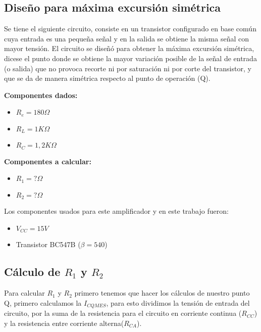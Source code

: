 \begin{multicols}{2}

	\section{Diseño para máxima excursión simétrica}

	\sangria{} Se tiene el siguiente circuito, consiste en un transistor configurado en base común cuya entrada es una pequeña señal y en la salida se obtiene la misma señal con mayor tensión.
	\sangria{} El circuito se diseñó para obtener la máxima excursión simétrica, dicese el punto donde se obtiene la mayor variación posible de la señal de entrada (o salida) que no provoca recorte ni por saturación ni por corte del transistor, y que se da de manera simétrica respecto al punto de operación (Q). \\[5pt]


	\textbf{Componentes dados:}
    \begin{itemize}[nosep]
        \item $R_e = 180\Omega$
        \item $R_L = 1 K\Omega$
        \item $R_C = 1,2 K\Omega$
    \end{itemize}

    \textbf{Componentes a calcular:}
    \begin{itemize}[nosep]
        \item $R_1 = ?\Omega$
        \item $R_2 = ?\Omega$
    \end{itemize}

    \sangria{} Los componentes usados para este amplificador y en este trabajo fueron:
    \begin{itemize}[nosep]
        \item $V_{CC} = 15V$
        \item Transistor BC547B ($\beta = 540$)
    \end{itemize}

		\subsection{Cálculo de $R_1$ y $R_2$}
			\sangria{}Para calcular $R_1$ y $R_2$ primero tenemos que hacer los cálculos de nuestro punto Q, primero calculamos la $I_{CQMES}$, para esto dividimos la tensión de entrada del circuito, por la suma de la resistencia para el circuito en corriente continua ($R_{CC}$) y la resistencia entre corriente alterna($R_{CA}$).


\end{multicols}
